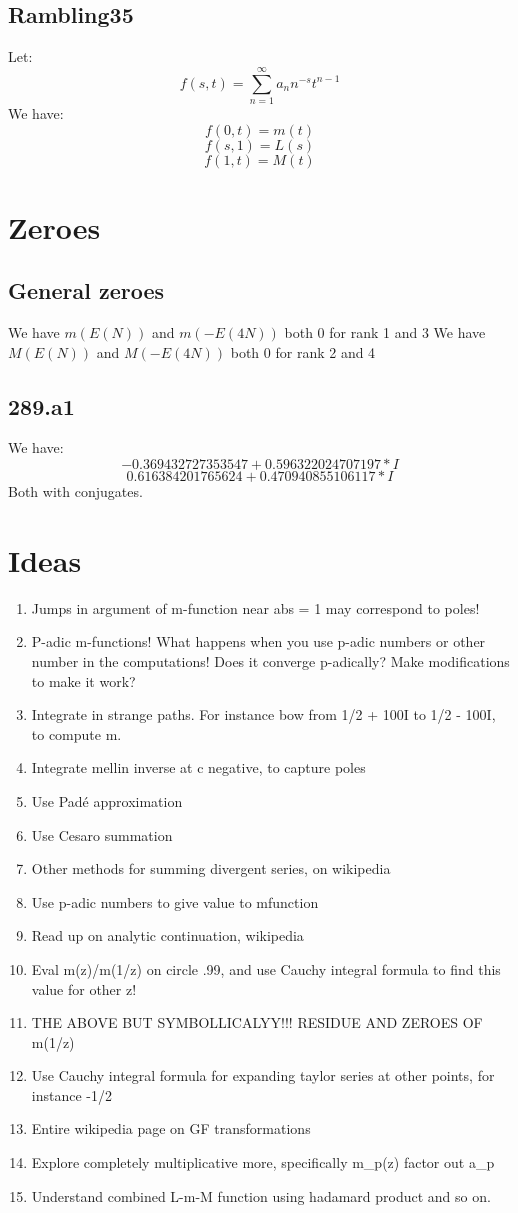 \documentclass[a4paper]{amsart}
\begin{document}
\subsection{Rambling35}
Let: 
$$f(s, t) = \sum_{n = 1}^\infty a_n n^{-s} t^{n - 1}$$
We have: 
$$f(0, t) = m(t)$$
$$f(s, 1) = L(s)$$
$$f(1, t) = M(t)$$


\section{Zeroes}

\subsection{General zeroes}

We have $m(E(N))$ and $m(-E(4N))$ both $0$ for rank 1 and 3
We have $M(E(N))$ and $M(-E(4N))$ both $0$ for rank 2 and 4

\subsection{289.a1}

We have:
$$-0.369432727353547 + 0.596322024707197*I$$
$$0.616384201765624 + 0.470940855106117*I$$
Both with conjugates.

\section{Ideas}

\begin{enumerate}
  \item Jumps in argument of m-function near abs = 1 may correspond to poles!
  \item P-adic m-functions! What happens when you use p-adic numbers or other number in the computations! Does it converge p-adically? Make modifications to make it work?
  \item Integrate in strange paths. For instance bow from 1/2 + 100I to 1/2 - 100I, to compute m.
  \item Integrate mellin inverse at c negative, to capture poles
  \item Use Padé approximation
  \item Use Cesaro summation
  \item Other methods for summing divergent series, on wikipedia
  \item Use p-adic numbers to give value to mfunction
  \item Read up on analytic continuation, wikipedia
  \item Eval m(z)/m(1/z) on circle .99, and use Cauchy integral formula to find this value for other z!
  \item THE ABOVE BUT SYMBOLLICALYY!!! RESIDUE AND ZEROES OF m(1/z)
  \item Use Cauchy integral formula for expanding taylor series at other points, for instance -1/2
  \item Entire wikipedia page on GF transformations
  \item Explore completely multiplicative more, specifically m_p(z) factor out a_p
  \item Understand combined L-m-M function using hadamard product and so on.
\end{enumerate}
\end{document}
